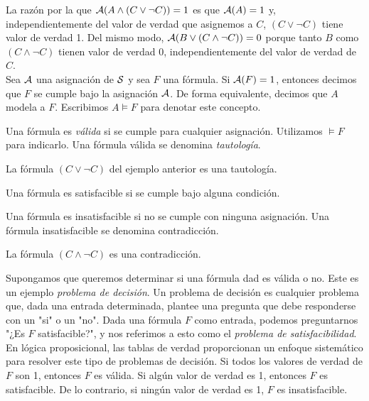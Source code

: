 \documentclass[12pt,a4paper]{book}
\newcommand{\comillas}[1]{"#1"}
\begin{document}
    La razón por la que $\AA(A\wedge(C\vee\neg C))=1$ es que $\AA(A)=1$ y, independientemente del valor de verdad que asignemos a $C$, $(C\vee\neg C)$
    tiene valor de verdad 1. Del mismo modo, $\AA(B\vee(C\wedge\neg C))=0$ porque tanto $B$ como $(C\wedge\neg C)$ tienen valor de verdad 0, independientemente del
    valor de verdad de $C$.\\
    Sea $\AA$ una asignación de $\SS$ y sea $F$ una fórmula. Si $\AA(F)=1$, entonces decimos que $F$ se cumple bajo la asignación $\AA$. De forma equivalente,
    decimos que $A$ modela a $F$. Escribimos $A\models F$ para denotar este concepto.

    \begin{definicion}
        Una fórmula es \textit{válida} si se cumple para cualquier asignación. Utilizamos $\models F$ para indicarlo. Una fórmula válida se denomina
        \textit{tautología}. 
    \end{definicion}

    \begin{ejemplo}
        La fórmula $(C\vee\neg C)$ del ejemplo anterior es una tautología.
    \end{ejemplo}

    \begin{definicion}[Satisfacibilidad]
        Una fórmula es satisfacible si se cumple bajo alguna condición.
    \end{definicion}

    \begin{definicion}
        Una fórmula es insatisfacible si no se cumple con ninguna asignación. Una fórmula insatisfacible se denomina contradicción.
    \end{definicion}

    \begin{ejemplo}
        La fórmula $(C\wedge\neg C)$ es una contradicción.
    \end{ejemplo}

    Supongamos que queremos determinar si una fórmula dad es válida o no. Este es un ejemplo \textit{problema de decisión}. Un problema de decisión es cualquier
    problema que, dada una entrada determinada, plantee una pregunta que debe responderse con un \comillas{si} o un \comillas{no}. Dada una fórmula $F$ como entrada,
    podemos preguntarnos \comillas{¿Es $F$ satisfacible?}, y nos referimos a esto como el \textit{problema de satisfacibilidad}. En lógica proposicional, las
    tablas de verdad proporcionan un enfoque sistemático para resolver este tipo de problemas de decisión. Si todos los valores de verdad de $F$ son 1, entonces
    $F$ es válida. Si algún valor de verdad es 1, entonces $F$ es satisfacible. De lo contrario, si ningún valor de verdad es 1, $F$ es insatisfacible.
\end{document}
